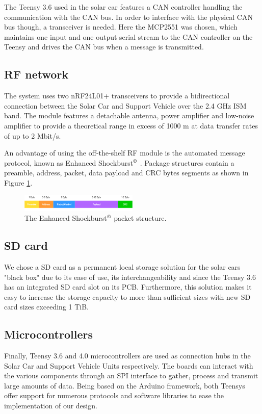 \documentclass[conference]{IEEEtran}
\begin{document}
The Teensy 3.6 used in the solar car features a CAN controller handling the communication with the CAN bus. In order to interface with the physical CAN bus though, a transceiver is needed. Here the MCP2551 was chosen, which maintains one input and one output serial stream to the CAN controller on the Teensy and drives the CAN bus when a message is transmitted.
\subsection{RF network} %
The system uses two nRF24L01+ transceivers to provide a bidirectional connection between the Solar Car and Support Vehicle over the 2.4 GHz ISM band. The module features a detachable antenna, power amplifier and low-noise amplifier to provide a theoretical range in excess of 1000 m at data transfer rates of up to 2 Mbit/s.

An advantage of using the off-the-shelf RF module is the automated message protocol, known as Enhanced Shockburst$^\copyright$ \cite{shockburst}. Package structures contain a preamble, address, packet, data payload and CRC bytes segments as shown in Figure \ref{fig:shockburst}. 

\begin{figure}[h]
    \centering
    \includegraphics[width=0.5\textwidth]{documentation/images/EnhancedShockburst.png}
    \caption{The Enhanced Shockburst$^\copyright$ packet structure.}
    \label{fig:shockburst}
\end{figure}

\subsection{SD card}

We chose a SD card as a permanent local storage solution for the solar cars "black box" due to its ease of use, its interchangeability and since the Teensy 3.6 has an integrated SD card slot on its PCB. Furthermore, this solution makes it easy to increase the storage capacity to more than sufficient sizes with new SD card sizes exceeding 1 TiB.

\subsection{Microcontrollers} %
Finally, Teensy 3.6 and 4.0 microcontrollers are used as connection hubs in the Solar Car and Support Vehicle Units respectively. The boards can interact with the various components through an SPI interface to gather, process and transmit large amounts of data. Being based on the Arduino framework, both Teensys offer support for numerous protocols and software libraries to ease the implementation of our design. 
\end{document}
